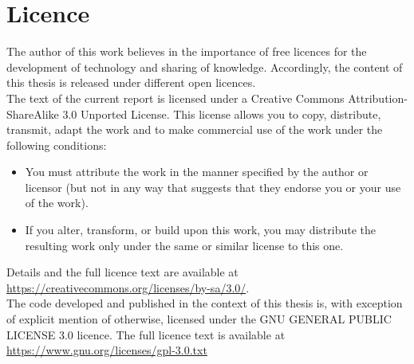 \section{Licence}

The author of this work believes in the importance of free licences for the development of technology and sharing of knowledge.
Accordingly, the content of this thesis is released under different open licences.\\

The text of the current report is licensed under a Creative Commons Attribution-ShareAlike 3.0 Unported License.
This license allows you to copy, distribute, transmit, adapt the work and to make commercial use of the work under the following conditions:

\begin{itemize}
\item You must attribute the work in the manner specified by the author or licensor (but not in any way that suggests that they endorse you or your use of the work).
\item  If you alter, transform, or build upon this work, you may distribute the resulting work only under the same or similar license to this one. 
\end{itemize}

Details and the full licence text are available at \url{https://creativecommons.org/licenses/by-sa/3.0/}.\\

The code developed and published in the context of this thesis is, with exception of explicit mention of otherwise, licensed under the GNU GENERAL PUBLIC LICENSE 3.0 licence. The full licence text is available at \url{https://www.gnu.org/licenses/gpl-3.0.txt}





